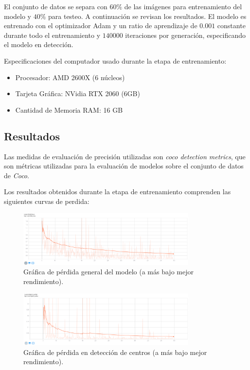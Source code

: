 \documentclass[letter,12pt]{report}
\begin{document}
El conjunto de datos se separa con $60\%$ de las imágenes para entrenamiento del modelo y
$40\%$ para testeo. A continuación se revisan los resultados. El modelo es entrenado con el
optimizador Adam y un ratio de aprendizaje de $0.001$ constante durante todo el entrenamiento
y $140000$ iteraciones por generación, especificando el modelo en detección.

Especificaciones del computador usado durante la etapa de entrenamiento:

\begin{itemize}
    \item Procesador: AMD 2600X (6 núcleos)
    \item Tarjeta Gráfica: NVidia RTX 2060 (6GB)
    \item Cantidad de Memoria RAM: 16 GB
\end{itemize}

\subsection{Resultados}
Las medidas de evaluación de precisión utilizadas son \textit{coco detection metrics},
que son métricas utilizadas para la evaluación de modelos sobre el conjunto de datos de
\textit{Coco}.

Los resultados obtenidos durante la etapa de entrenamiento comprenden las siguientes curvas
de perdida:

\begin{figure}[ht]
    \centering
    \includegraphics[width=0.8\textwidth]{total_loss}
    \caption{Gráfica de pérdida general del modelo (a más bajo mejor rendimiento).}
    \label{fig:total_loss}
\end{figure}

\begin{figure}[ht]
    \centering
    \includegraphics[width=0.8\textwidth]{object_center}
    \caption{Gráfica de pérdida en detección de centros (a más bajo mejor rendimiento).}
    \label{fig:object_center}
\end{figure}
\end{document}

